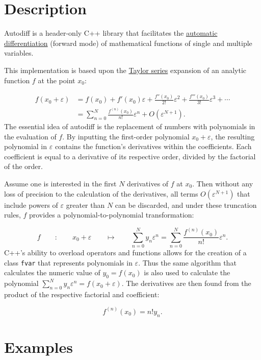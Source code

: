 \documentclass{article}
\begin{document}
\section{Description}

Autodiff is a header-only C++ library that facilitates the
\href{https://en.wikipedia.org/wiki/Automatic_differentiation}{automatic differentiation} (forward mode) of
mathematical functions of single and multiple variables.

This implementation is based upon the \href{https://en.wikipedia.org/wiki/Taylor_series}{Taylor series} expansion of
an analytic function $f$ at the point $x_0$:

\begin{align*}
f(x_0+\varepsilon) &= f(x_0) + f'(x_0)\varepsilon + \frac{f''(x_0)}{2!}\varepsilon^2 + \frac{f'''(x_0)}{3!}\varepsilon^3 + \cdots \\
  &= \sum_{n=0}^N\frac{f^{(n)}(x_0)}{n!}\varepsilon^n + O\left(\varepsilon^{N+1}\right).
\end{align*}
The essential idea of autodiff is the replacement of numbers with polynomials in the evaluation of $f$. By inputting
the first-order polynomial $x_0+\varepsilon$, the resulting polynomial in $\varepsilon$ contains the function's
derivatives within the coefficients. Each coefficient is equal to a derivative of its respective order, divided
by the factorial of the order.

Assume one is interested in the first $N$ derivatives of $f$ at $x_0$. Then without any loss of precision to the
calculation of the derivatives, all terms $O\left(\varepsilon^{N+1}\right)$ that include powers of $\varepsilon$
greater than $N$ can be discarded, and under these truncation rules, $f$ provides a polynomial-to-polynomial
transformation:

\[
f \qquad : \qquad x_0+\varepsilon \qquad \mapsto \qquad
    \sum_{n=0}^Ny_n\varepsilon^n=\sum_{n=0}^N\frac{f^{(n)}(x_0)}{n!}\varepsilon^n.
\]
C++'s ability to overload operators and functions allows for the creation of a class {\tt fvar} that represents
polynomials in $\varepsilon$. Thus the same algorithm that calculates the numeric value of $y_0=f(x_0)$ is also
used to calculate the polynomial $\sum_{n=0}^Ny_n\varepsilon^n=f(x_0+\varepsilon)$. The derivatives are then found
from the product of the respective factorial and coefficient:

\[ f^{(n)}(x_0)=n!y_n. \]

\section{Examples}
\end{document}

